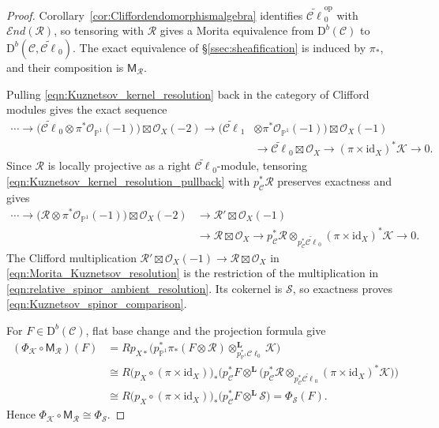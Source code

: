 \documentclass[12pt, letterpaper]{amsart}
\theoremstyle{definition}
\newcommand{\PP}{\mathbb{P} }
\newcommand{\cC}{\mathcal{C} }
\newcommand{\cK}{\mathcal{K} }
\newcommand{\cO}{\mathcal{O} }
\newcommand{\cR}{\mathcal{R} }
\newcommand{\cS}{\mathcal{S} }
\newcommand{\rD}{\mathrm{D} }
\newcommand{\cEnd}{\mathcal{E}nd}
\begin{document}
\begin{proof}
Corollary~\ref{cor:Cliffordendomorphismalgebra} identifies \(\widetilde{\cC\ell}_0^{\mathrm{op}}\) with \(\cEnd(\cR)\), so tensoring with \(\cR\) gives a Morita equivalence from \(\rD^b(\cC)\) to \(\rD^b(\cC,\widetilde{\cC\ell}_0)\). The exact equivalence of \S\ref{ssec:sheafification} is induced by \(\pi_*\), and their composition is \(\mathsf M_{\cR}\).

Pulling \eqref{eqn:Kuznetsov_kernel_resolution} back in the category of Clifford modules gives the exact sequence
\begin{align}\label{eqn:Kuznetsov_kernel_resolution_pullback}
\cdots\to\bigl(\widetilde{\cC\ell}_0\otimes\pi^*\cO_{\PP^1}(-1)\bigr)\boxtimes\cO_X(-2)\to\bigl(\widetilde{\cC\ell}_1&\otimes\pi^*\cO_{\PP^1}(-1)\bigr)\boxtimes\cO_X(-1)\\
&\to\widetilde{\cC\ell}_0\boxtimes\cO_X\to(\pi\times\mathrm{id}_X)^*\cK\to0.\nonumber
\end{align}
Since \(\cR\) is locally projective as a right \(\widetilde{\cC\ell}_0\)-module, tensoring \eqref{eqn:Kuznetsov_kernel_resolution_pullback} with \(p_{\cC}^*\cR\) preserves exactness and gives
\begin{align}\label{eqn:Morita_Kuznetsov_resolution}
\cdots\to\bigl(\cR\otimes\pi^*\cO_{\PP^1}(-1)\bigr)\boxtimes\cO_X(-2)&\to\cR'\boxtimes\cO_X(-1)\\
&\to\cR\boxtimes\cO_X\to p_{\cC}^*\cR\otimes_{p_{\cC}^*\widetilde{\cC\ell}_0}(\pi\times\mathrm{id}_X)^*\cK\to0.\nonumber
\end{align}
The Clifford multiplication \(\cR'\boxtimes\cO_X(-1)\to\cR\boxtimes\cO_X\) in \eqref{eqn:Morita_Kuznetsov_resolution} is the restriction of the multiplication in \eqref{eqn:relative_spinor_ambient_resolution}. Its cokernel is \(\cS\), so exactness proves \eqref{eqn:Kuznetsov_spinor_comparison}.

For \(F\in\rD^b(\cC)\), flat base change and the projection formula give
\begin{align*}
(\Phi_{\cK}\circ\mathsf M_{\cR})(F) &=Rp_{X*}\bigl(p_{\PP^1}^*\pi_*(F\otimes\cR)\otimes_{p_{\PP^1}^*\cC\ell_0}^{\mathbf L}\cK\bigr)\\
&\cong R\bigl(p_X\circ(\pi\times\mathrm{id}_X)\bigr)_*\bigl(p_{\cC}^*F\otimes^{\mathbf L}\bigl(p_{\cC}^*\cR\otimes_{p_{\cC}^*\widetilde{\cC\ell}_0}(\pi\times\mathrm{id}_X)^*\cK\bigr)\bigr)\\
&\cong R\bigl(p_X\circ(\pi\times\mathrm{id}_X)\bigr)_*\bigl(p_{\cC}^*F\otimes^{\mathbf L}\cS\bigr)=\Phi_{\cS}(F).
\end{align*}
Hence \(\Phi_{\cK}\circ\mathsf M_{\cR}\cong\Phi_{\cS}\).
\end{proof}
\end{document}

